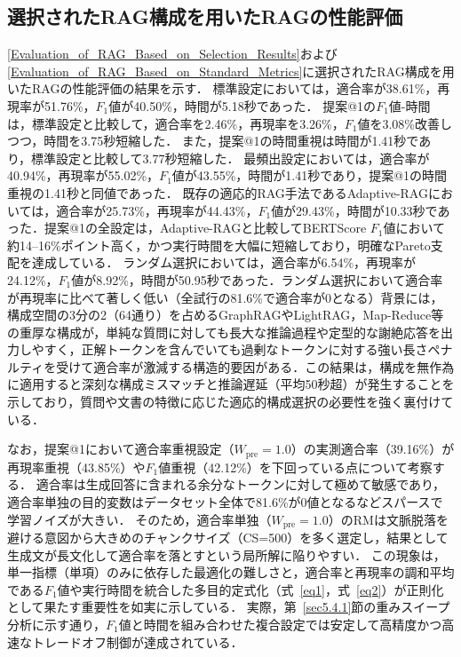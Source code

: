 \subsection{選択されたRAG構成を用いたRAGの性能評価} \label{sec5.2}
\ref{Evaluation_of_RAG_Based_on_Selection_Results}および\ref{Evaluation_of_RAG_Based_on_Standard_Metrics}に選択されたRAG構成を用いたRAGの性能評価の結果を示す．
標準設定においては，適合率が38.61\%，再現率が51.76\%，$F_1$値が40.50\%，時間が5.18秒であった．
提案@1の$F_1$値-時間は，標準設定と比較して，適合率を2.46\%，再現率を3.26\%，$F_1$値を3.08\%改善しつつ，時間を3.75秒短縮した．
また，提案@1の時間重視は時間が1.41秒であり，標準設定と比較して3.77秒短縮した．
最頻出設定においては，適合率が40.94\%，再現率が55.02\%，$F_1$値が43.55\%，時間が1.41秒であり，提案@1の時間重視の1.41秒と同値であった．
既存の適応的RAG手法であるAdaptive-RAGにおいては，適合率が25.73\%，再現率が44.43\%，$F_1$値が29.43\%，時間が10.33秒であった．提案@1の全設定は，Adaptive-RAGと比較してBERTScore $F_1$値において約14--16\%ポイント高く，かつ実行時間を大幅に短縮しており，明確なPareto支配を達成している．
ランダム選択においては，適合率が6.54\%，再現率が24.12\%，$F_1$値が8.92\%，時間が50.95秒であった．ランダム選択において適合率が再現率に比べて著しく低い（全試行の81.6\%で適合率が0となる）背景には，構成空間の3分の2（64通り）を占めるGraphRAGやLightRAG，Map-Reduce等の重厚な構成が，単純な質問に対しても長大な推論過程や定型的な謝絶応答を出力しやすく，正解トークンを含んでいても過剰なトークンに対する強い長さペナルティを受けて適合率が激減する構造的要因がある．この結果は，構成を無作為に適用すると深刻な構成ミスマッチと推論遅延（平均50秒超）が発生することを示しており，質問や文書の特徴に応じた適応的構成選択の必要性を強く裏付けている．

なお，提案@1において適合率重視設定（$W_{\mathrm{pre}}=1.0$）の実測適合率（39.16\%）が再現率重視（43.85\%）や$F_1$値重視（42.12\%）を下回っている点について考察する．
適合率は生成回答に含まれる余分なトークンに対して極めて敏感であり，適合率単独の目的変数はデータセット全体で81.6\%が0値となるなどスパースで学習ノイズが大きい．
そのため，適合率単独（$W_{\mathrm{pre}}=1.0$）のRMは文脈脱落を避ける意図から大きめのチャンクサイズ（CS=500）を多く選定し，結果として生成文が長文化して適合率を落とすという局所解に陥りやすい．
この現象は，単一指標（単項）のみに依存した最適化の難しさと，適合率と再現率の調和平均である$F_1$値や実行時間を統合した多目的定式化（式~\eqref{eq1}，式~\eqref{eq2}）が正則化として果たす重要性を如実に示している．
実際，第~\ref{sec5.4.1}節の重みスイープ分析に示す通り，$F_1$値と時間を組み合わせた複合設定では安定して高精度かつ高速なトレードオフ制御が達成されている．

